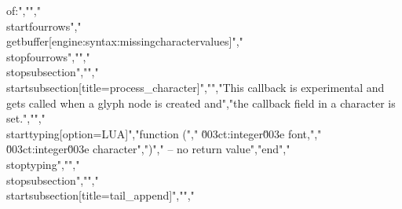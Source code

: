 of:","","\\startfourrows","\\getbuffer[engine:syntax:missingcharactervalues]","\\stopfourrows","","\\stopsubsection","","\\startsubsection[title=process_character]","","This callback is experimental and gets called when a glyph node is created and","the callback field in a character is set.","","\\starttyping[option=LUA]","function (","    \u003ct:integer\u003e font,","    \u003ct:integer\u003e character",")","    -- no return value","end","\\stoptyping","","\\stopsubsection","","\\startsubsection[title=tail_append]","","%